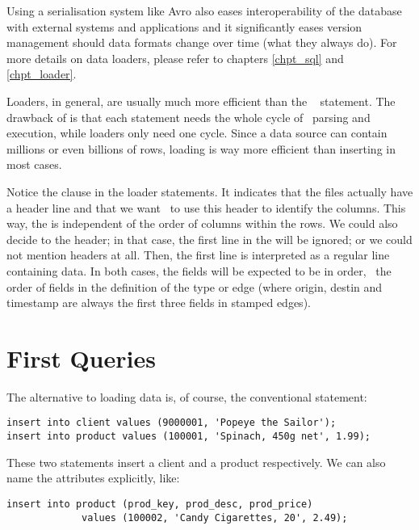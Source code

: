 Using a serialisation system like Avro also eases
interoperability of the database with
external systems and applications and it
significantly eases version management should data formats
change over time (what they always do). 
For more details on data loaders, please refer to chapters
\ref{chpt_sql} and \ref{chpt_loader}.

Loaders, in general, are usually much more efficient than
the \sql\  statement.
The drawback of  is that each statement
needs the whole cycle of \sql\ parsing and execution,
while loaders only need one cycle. Since a data source
can contain millions or even billions of rows,
loading is way more efficient than inserting in most cases.

Notice the  clause in the loader statements.
It indicates that the  files actually
have a header line and that we want \nowdb\ to use this header
to identify the columns.
This way, the  is independent
of the order of columns within the rows.
We could also decide to  the header;
in that case, the first line
in the  will be ignored;
or we could not mention headers at all.
Then, the first line is interpreted as a regular
line containing data.
In both cases, the fields will be expected to be
in  order, \ie\ the order of fields in
the definition of the type or edge (where
origin, destin and timestamp are always
the first three fields in stamped edges).

\section{First Queries}
The alternative to loading data is, of course, the conventional
 statement:

\begin{sqlcode}
\begin{lstlisting}
insert into client values (9000001, 'Popeye the Sailor');
insert into product values (100001, 'Spinach, 450g net', 1.99);
\end{lstlisting}
\end{sqlcode}

These two statements insert a client and a product respectively.
We can also name the attributes explicitly, like:

\begin{sqlcode}
\begin{lstlisting}
insert into product (prod_key, prod_desc, prod_price)
             values (100002, 'Candy Cigarettes, 20', 2.49);
\end{lstlisting}
\end{sqlcode}

